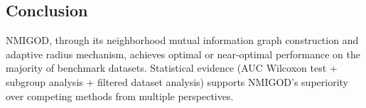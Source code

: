 \documentclass[11pt,a4paper]{article}
\begin{document}
\subsection{Conclusion}
NMIGOD, through its neighborhood mutual information graph construction and adaptive radius mechanism, achieves optimal or near-optimal performance on the majority of benchmark datasets. Statistical evidence (AUC Wilcoxon test + subgroup analysis + filtered dataset analysis) supports NMIGOD's superiority over competing methods from multiple perspectives.
\end{document}
